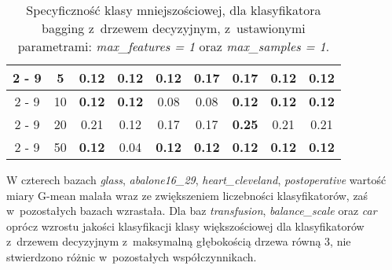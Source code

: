 \begin{table}[H]
\begin{center}
{\begin{tabular}{c|c|ccccccc}
				\cline{2%
					-%
					9}%
				&5&0.12&0.12&0.12&\textbf{0.17}&\textbf{0.17}&0.12&0.12\\%
				\cline{2%
					-%
					9}%
				&10&\textbf{0.12}&\textbf{0.12}&0.08&0.08&\textbf{0.12}&\textbf{0.12}&\textbf{0.12}\\%
				\cline{2%
					-%
					9}%
				&20&0.21&0.12&0.17&0.17&\textbf{0.25}&0.21&0.21\\%
				\cline{2%
					-%
					9}%
				&50&\textbf{0.12}&0.04&\textbf{0.12}&\textbf{0.12}&\textbf{0.12}&\textbf{0.12}&\textbf{0.12}\\%
				\hline%
			\end{tabular}}
			\caption{Specyficzność klasy mniejszościowej, dla klasyfikatora bagging z~drzewem decyzyjnym, z~ustawionymi parametrami: \textit{max\_features = 1} oraz \textit{max\_samples = 1}.}
			\label{baggingdrzewospec}
		\end{center}
	\end{table}
W czterech bazach \textit{glass}, \textit{abalone16\_29}, \textit{heart\_cleveland}, \textit{postoperative} wartość miary G-mean malała wraz ze zwiększeniem liczebności klasyfikatorów, zaś w~pozostałych bazach wzrastała. Dla baz \textit{transfusion}, \textit{balance\_scale} oraz \textit{car} oprócz wzrostu jakości klasyfikacji klasy większościowej dla klasyfikatorów z~drzewem decyzyjnym z~maksymalną głębokością drzewa równą 3, nie stwierdzono różnic w~pozostałych współczynnikach. 

